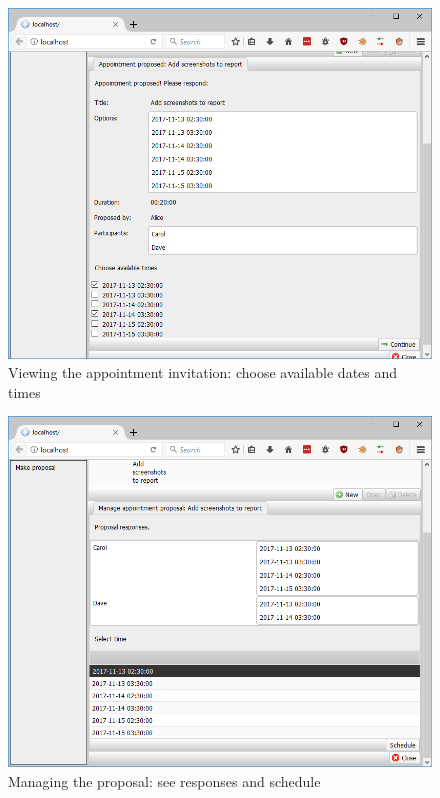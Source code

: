 \documentclass{article}
\begin{document}
	\begin{figure}[h!]
		\includegraphics[width=\textwidth]{07_dave_choose_proposal_date_times}
		\caption{Viewing the appointment invitation: choose available dates and times}
	\end{figure}
	
	\begin{figure}[h!]
		\includegraphics[width=\textwidth]{08_manage_proposal}
		\caption{Managing the proposal: see responses and schedule}
	\end{figure}
	
\end{document}
